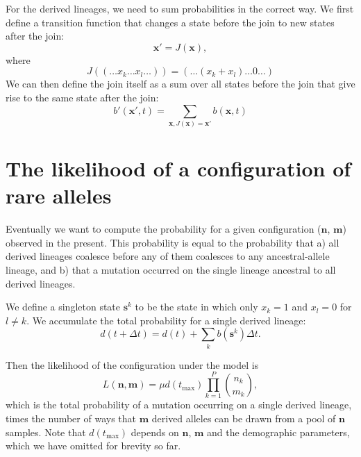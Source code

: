 \documentclass[a4paper]{article}
\begin{document}
For the derived lineages, we need to sum probabilities in the correct way. We first define a transition function that changes a state before the join to new states after the join:
\begin{equation}
    \mathbf{x}' = J(\mathbf{x}),
\end{equation} 
where
\begin{equation}
    J((\ldots x_k \ldots x_l \dots)) = (\ldots (x_k + x_l) \ldots 0 \ldots)
\end{equation}
We can then define the join itself as a sum over all states before the join that give rise to the same state after the join:
\begin{equation}
    b'(\mathbf{x}',t) = \sum_{\mathbf{x},J(\mathbf{x})=\mathbf{x}'} b(\mathbf{x},t)
\end{equation}
 
\section{The likelihood of a configuration of rare alleles}
    
Eventually we want to compute the probability for a given configuration ($\mathbf{n}$, $\mathbf{m}$) observed in the present. This probability is equal to the probability that a) all derived lineages coalesce before any of them coalesces to any ancestral-allele lineage, and b) that a mutation occurred on the single lineage ancestral to all derived lineages.

We define a singleton state $\mathbf{s}^k$ to be the state in which only $x_k=1$ and $x_l=0$ for $l\neq k$. We accumulate the total probability for a single derived lineage:
\begin{equation}
    d(t+\Delta t) = d(t) + \sum_k b(\mathbf{s}^k)\Delta t.
\end{equation}

Then the likelihood of the configuration under the model is
\begin{equation}
    \label{eq_Lnm}
    L(\mathbf{n}, \mathbf{m})=\mu d(t_\mathrm{max}) \prod_{k=1}^P \binom{n_k}{m_k},
\end{equation}
which is the total probability of a mutation occurring on a single derived lineage, times the number of ways that $\mathbf{m}$ derived alleles can be drawn from a pool of $\mathbf{n}$ samples. Note that $d(t_\mathrm{max})$ depends on $\mathbf{n}$, $\mathbf{m}$ and the demographic parameters, which we have omitted for brevity so far. 
\end{document}
